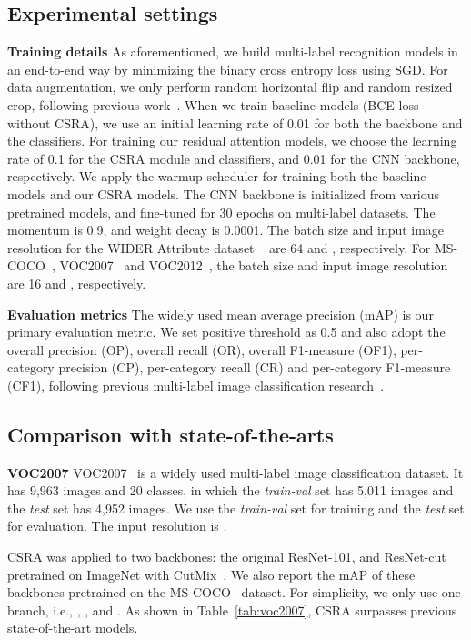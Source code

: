 \documentclass[10pt,twocolumn,letterpaper]{article}
\begin{document}
\subsection{Experimental settings}

\noindent\textbf{Training details} As aforementioned, we build multi-label recognition models in an end-to-end way by minimizing the binary cross entropy loss using SGD. For data augmentation, we only perform random horizontal flip and random resized crop, following previous work~\cite{2019_CVPR_GCN,2019_ICCV_GCNre}. When we train baseline models (BCE loss without CSRA), we use an initial learning rate of 0.01 for both the backbone and the classifiers. For training our residual attention models, we choose the learning rate of 0.1 for the CSRA module and classifiers, and 0.01 for the CNN backbone, respectively. We apply the warmup scheduler for training both the baseline models and our CSRA models. The CNN backbone is initialized from various pretrained models, and fine-tuned for 30 epochs on multi-label datasets. The momentum is 0.9, and weight decay is 0.0001. The batch size and input image resolution for the WIDER Attribute dataset ~\cite{Wider} are 64 and , respectively. For MS-COCO~\cite{MSCOCO}, VOC2007~\cite{VOC} and VOC2012~\cite{VOC2012}, the batch size and input image resolution are 16 and , respectively.

\vspace{6pt}\noindent\textbf{Evaluation metrics} The widely used mean average precision (mAP) is our primary evaluation metric. We set positive threshold as 0.5 and also adopt the overall precision (OP), overall recall (OR), overall F1-measure (OF1), per-category precision (CP), per-category recall (CR) and per-category F1-measure (CF1), following previous multi-label image classification research~\cite{2020_arxiv_Gaobb,2019_CVPR_GCN,2019_ICCV_GCNre,2019_CVPR_VA}.

\subsection{Comparison with state-of-the-arts}

\noindent\textbf{VOC2007} VOC2007~\cite{VOC} is a widely used multi-label image classification dataset. It has 9,963 images and 20 classes, in which the \emph{train-val} set has 5,011 images and the \emph{test} set has 4,952 images. We use the \emph{train-val} set for training and the \emph{test} set for evaluation. The input resolution is .

CSRA was applied to two backbones: the original ResNet-101, and ResNet-cut pretrained on ImageNet with CutMix~\cite{cutmix}. We also report the mAP of these backbones pretrained on the MS-COCO~\cite{MSCOCO} dataset. For simplicity, we only use one branch, i.e., , , and . As shown in Table~\ref{tab:voc2007}, CSRA surpasses previous state-of-the-art models.
\end{document}
